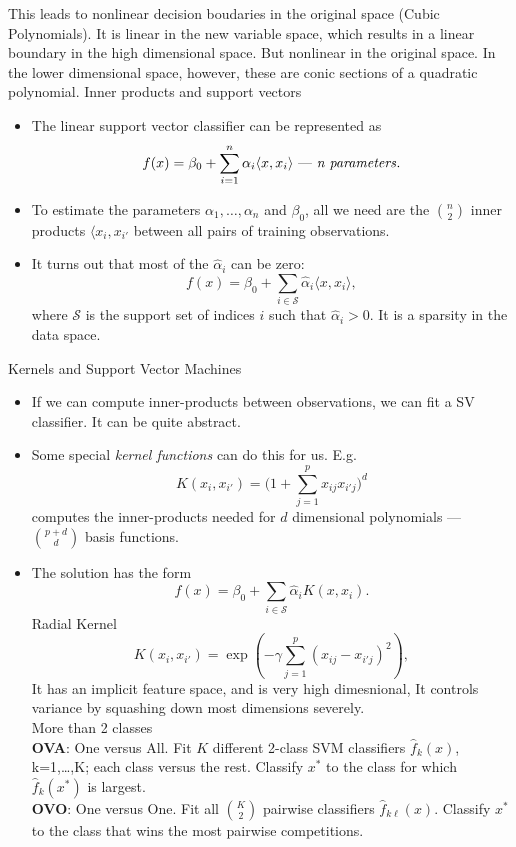 \documentclass[11pt, a4paper]{article}
\begin{document}
This leads to nonlinear decision boudaries in the original space (Cubic Polynomials). It is linear in the new variable space, which results in a linear boundary in the high dimensional space. But nonlinear in the original space. In the lower dimensional space, however, these are conic sections of a quadratic polynomial.
Inner products and support vectors
\begin{itemize}
\item The linear support vector classifier can be represented as 
  \[
    f(x)=\beta_0+\sum_{i=1}^n \alpha_i\langle x,x_i\rangle \text{  --- \emph{n parameters}}.
  \]
\item To estimate the parameters $\alpha_1,\dots,\alpha_n$ and $\beta_0$, all we need are the $n \choose 2$ inner products $\langle x_i, x_{i'}$ between all pairs of training observations.
\item It turns out that most of the $\hat{\alpha}_i$ can be zero:
\[
  f(x)=\beta_0+\sum_{i\in \mathcal{S}}\hat{\alpha}_i\langle x,x_i\rangle ,
\]
where $\mathcal{S}$ is the support set of indices $i$ such that $\hat{\alpha}_i>0$. It is a sparsity in the data space.
\end{itemize}
Kernels and Support Vector Machines
\begin{itemize}
  \item If we can compute inner-products between observations, we can fit a SV classifier. It can be quite abstract.
  \item Some special \emph{kernel functions} can do this for us. E.g.
\[
  K(x_i,x_{i'})=\bigg(1+\sum_{j=1}^p x_{ij}x_{i'j}   \bigg)^d
\]
computes the inner-products needed for $d$ dimensional polynomials --- ${p+d\choose d}$ basis functions.
\item The solution has the form
  \[
    f(x)=\beta_0+\sum_{i\in\mathcal{S}}\hat{\alpha}_i K(x,x_i).
  \]
  Radial Kernel\\
  \[
    K(x_i,x_{i'})=\exp(-\gamma \sum_{j=1}^p(x_{ij}-x_{i'j})^2),
  \]
  It has an implicit feature space, and is very high dimesnional, It controls variance by squashing down most dimensions severely.\\[1mm]
More than 2 classes\\
\textbf{OVA}: One versus All. Fit $K$ different 2-class SVM classifiers $\hat{f}_k(x)$, k=1,\dots,K; each class versus the rest. Classify $x^*$ to the class for which $\hat{f}_k(x^*)$ is largest.\\
\textbf{OVO}: One versus One. Fit all $K \choose 2$ pairwise classifiers $\hat{f}_{k\ell}(x)$. Classify $x^*$ to the class that wins the most pairwise competitions.
\end{itemize}
\end{document}
